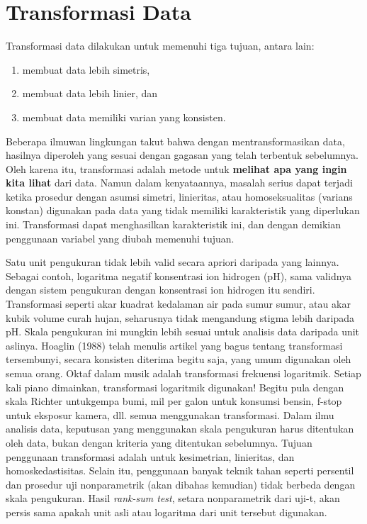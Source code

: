 \documentclass[]{book}
\providecommand{\tightlist}{%
  \setlength{\itemsep}{0pt}\setlength{\parskip}{0pt}}
\begin{document}
\section{Transformasi Data}\label{transformasi-data-1}

Transformasi data dilakukan untuk memenuhi tiga tujuan, antara lain:

\begin{enumerate}
\def\labelenumi{\arabic{enumi}.}
\tightlist
\item
  membuat data lebih simetris,
\item
  membuat data lebih linier, dan
\item
  membuat data memiliki varian yang konsisten.
\end{enumerate}

Beberapa ilmuwan lingkungan takut bahwa dengan mentransformasikan data,
hasilnya diperoleh yang sesuai dengan gagasan yang telah terbentuk
sebelumnya. Oleh karena itu, transformasi adalah metode untuk
\textbf{melihat apa yang ingin kita lihat} dari data. Namun dalam
kenyataannya, masalah serius dapat terjadi ketika prosedur dengan asumsi
simetri, linieritas, atau homoseksualitas (varians konstan) digunakan
pada data yang tidak memiliki karakteristik yang diperlukan ini.
Transformasi dapat menghasilkan karakteristik ini, dan dengan demikian
penggunaan variabel yang diubah memenuhi tujuan.

Satu unit pengukuran tidak lebih valid secara apriori daripada yang
lainnya. Sebagai contoh, logaritma negatif konsentrasi ion hidrogen
(pH), sama validnya dengan sistem pengukuran dengan konsentrasi ion
hidrogen itu sendiri. Transformasi seperti akar kuadrat kedalaman air
pada sumur sumur, atau akar kubik volume curah hujan, seharusnya tidak
mengandung stigma lebih daripada pH. Skala pengukuran ini mungkin lebih
sesuai untuk analisis data daripada unit aslinya. Hoaglin (1988) telah
menulis artikel yang bagus tentang transformasi tersembunyi, secara
konsisten diterima begitu saja, yang umum digunakan oleh semua orang.
Oktaf dalam musik adalah transformasi frekuensi logaritmik. Setiap kali
piano dimainkan, transformasi logaritmik digunakan! Begitu pula dengan
skala Richter untukgempa bumi, mil per galon untuk konsumsi bensin,
f-stop untuk eksposur kamera, dll. semua menggunakan transformasi. Dalam
ilmu analisis data, keputusan yang menggunakan skala pengukuran harus
ditentukan oleh data, bukan dengan kriteria yang ditentukan sebelumnya.
Tujuan penggunaan transformasi adalah untuk kesimetrian, linieritas, dan
homoskedastisitas. Selain itu, penggunaan banyak teknik tahan seperti
persentil dan prosedur uji nonparametrik (akan dibahas kemudian) tidak
berbeda dengan skala pengukuran. Hasil \emph{rank-sum test}, setara
nonparametrik dari uji-t, akan persis sama apakah unit asli atau
logaritma dari unit tersebut digunakan.
\end{document}
